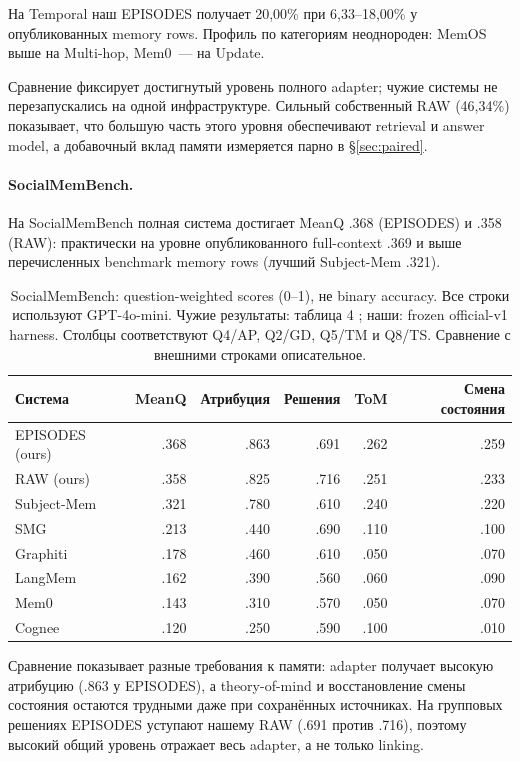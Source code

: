 \documentclass[11pt,a4paper]{article}
\newcommand{\raw}{RAW}
\newcommand{\episodes}{EPISODES}
\begin{document}
На Temporal наш \episodes{} получает 20,00\% при 6,33--18,00\% у
опубликованных memory rows. Профиль по категориям неоднороден: MemOS выше на
Multi-hop, Mem0~--- на Update.

Сравнение фиксирует достигнутый уровень полного adapter; чужие системы не
перезапускались на одной инфраструктуре. Сильный собственный \raw{} (46,34\%)
показывает, что большую часть этого уровня обеспечивают retrieval и answer
model, а добавочный вклад памяти измеряется парно в §\ref{sec:paired}.

\paragraph{SocialMemBench.}
На SocialMemBench полная система достигает MeanQ .368 (\episodes{}) и .358
(\raw{}): практически на уровне опубликованного full-context .369 и выше
перечисленных benchmark memory rows (лучший Subject-Mem .321).

\begin{table}[ht]
\centering\small
\begin{tabular}{@{}lrrrrr@{}}
\toprule
Система & MeanQ & Атрибуция & Решения & ToM & Смена состояния\\
\midrule
\episodes{} (ours) & .368 & .863 & .691 & .262 & .259\\
\raw{} (ours) & .358 & .825 & .716 & .251 & .233\\
\midrule
Subject-Mem & .321 & .780 & .610 & .240 & .220\\
SMG & .213 & .440 & .690 & .110 & .100\\
Graphiti & .178 & .460 & .610 & .050 & .070\\
LangMem & .162 & .390 & .560 & .060 & .090\\
Mem0 & .143 & .310 & .570 & .050 & .070\\
Cognee & .120 & .250 & .590 & .100 & .010\\
\bottomrule
\end{tabular}
\caption{SocialMemBench: question-weighted scores (0--1), не binary accuracy.
Все строки используют GPT-4o-mini. Чужие результаты: таблица 4
\citep{owolabi2026}; наши: frozen official-v1 harness.
Столбцы соответствуют Q4/AP, Q2/GD, Q5/TM и Q8/TS.
Сравнение с внешними строками описательное.}
\label{tab:social-external}
\end{table}

Сравнение показывает разные требования к памяти: adapter получает высокую
атрибуцию (.863 у \episodes{}), а theory-of-mind и восстановление смены состояния
остаются трудными даже при сохранённых источниках. На групповых решениях
\episodes{} уступают нашему \raw{} (.691 против .716), поэтому высокий общий уровень
отражает весь adapter, а не только linking.
\end{document}
